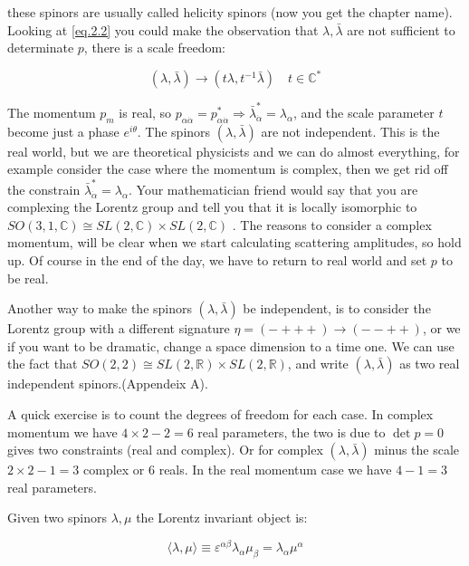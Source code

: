 these spinors are usually called  helicity spinors (now you get  the chapter name). Looking at \eqref{eq.2.2} you could make the observation that $\lambda,\bar{\lambda}$ are not sufficient to determinate $p$, there is a scale freedom:

\begin{equation}
(\lambda,\bar{\lambda}) \rightarrow  (t\lambda,t^{-1}\bar{\lambda})\quad t \in \mathbb{C}^{*}
\end{equation}  

The momentum $p_{m}$ is real, so  $p_{\alpha\dot{\alpha}} =p_{\alpha\dot{\alpha}}^{*} \Rightarrow \bar{\lambda}_{\dot{\alpha}}^{*}= \lambda_{\alpha}$, and the scale parameter $t$ become just a phase $e^{i\theta}$. The spinors $(\lambda,\bar{\lambda})$ are not independent. This is the real world, but we are theoretical physicists and we can do almost everything, for example consider the case where the momentum is complex, then we get rid off the constrain $\bar{\lambda}_{\dot{\alpha}}^{*}= \lambda_{\alpha}$. Your mathematician friend would say that you are complexing the Lorentz group and tell you that it is locally isomorphic to $SO(3,1,\mathbb{C}) \cong SL(2,\mathbb{C})  \times SL(2,\mathbb{C})$  . The reasons to consider a complex momentum, will be clear when we start calculating scattering amplitudes, so hold up. Of course in the end of the day, we have to return to real world and set $p$ to be real. 

Another way to make the spinors $(\lambda,\bar{\lambda})$ be independent, is to consider the Lorentz group with a different signature $\eta = (-+++) \rightarrow (--++) $, or we if you want to be dramatic, change a space dimension to a time one. We can use the fact that $SO(2,2) \cong SL(2,\mathbb{R})  \times SL(2,\mathbb{R})$, and write $(\lambda,\bar{\lambda})$ as two real independent spinors.(Appendeix A).

A quick exercise is to count the degrees of freedom for each case. In complex momentum we have $4 \times2 - 2 = 6$ real parameters, the two is due to $\det p = 0$ gives two constraints (real and complex). Or for complex $(\lambda,\bar{\lambda})$ minus the scale $2\times 2 -1 =3 $ complex or 6 reals. In the real momentum case we have $ 4 - 1 = 3$ real parameters.

Given two spinors $\lambda ,\mu $ the Lorentz invariant object  is:

\begin{equation}
\langle \lambda ,\mu \rangle  \equiv \varepsilon^{\alpha \beta} \lambda_{\alpha} \mu_{\beta} =\lambda_{\alpha} \mu^{\alpha}
\label{eq.2.4}   
\end{equation}


